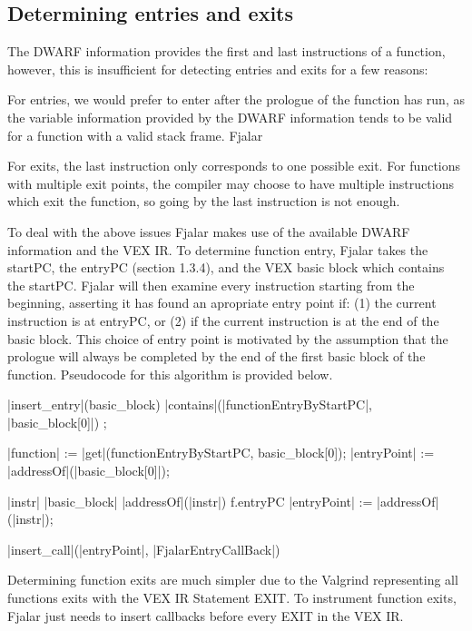 \documentclass[11pt]{article}
\begin{document}
\subsection{Determining entries and exits}
The DWARF information provides the first and last instructions of a
function, however, this is insufficient for detecting entries and
exits for a few reasons:

For entries, we would prefer to enter after the prologue of the
function has run, as the variable information provided by the DWARF
information tends to be valid for a function with a valid stack frame.
Fjalar

For exits, the last instruction only corresponds to one possible
exit. For functions with multiple exit points, the compiler
may choose to have multiple instructions which exit the function, so
going by the last instruction is not enough. 

To deal with the above issues Fjalar makes use of the available DWARF
information and the VEX IR. To determine function entry, Fjalar takes the
startPC, the entryPC (section 1.3.4), and the VEX basic block which
contains the startPC. Fjalar will then examine every instruction
starting from the beginning, asserting it has found an apropriate
entry point if: (1) the current instruction is at entryPC, or (2) if
the current instruction is at the end of the basic block. This
choice of entry point is motivated by the assumption that the prologue
will always be completed by the end of the first basic block of the
function. Pseudocode for this algorithm is provided below.

\begin{program}
\PROC |insert\_entry|(basic\_block) \BODY
  \IF \NOT |contains|(|functionEntryByStartPC|, |basic\_block[0]|) \THEN \EXIT \FI;

   |function| := |get|(functionEntryByStartPC, basic\_block[0]);
   |entryPoint| := |addressOf|(|basic\_block[0]|);

   \FOR |instr| \in |basic\_block| \DO
     \IF |addressOf|(|instr|) \leq f.entryPC \THEN \DO
       |entryPoint| := |addressOf|(|instr|);

   |insert\_call|(|entryPoint|, |FjalarEntryCallBack|)
   \ENDPROC
 \end{program}

Determining function exits are much simpler due to the Valgrind
representing all functions exits with the VEX IR Statement EXIT. To
instrument function exits, Fjalar just needs to insert callbacks
before every EXIT in the VEX IR.
\end{document}
